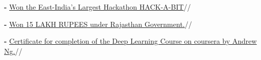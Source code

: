 \documentclass[espanol]{cv-style}     %
\begin{document}
\textbf{-}  {\href{https://www.facebook.com/pg/hackabit/posts/}{Won the East-India's Largest Hackathon HACK-A-BIT}}//

\textbf{-}
 {\href{https://www.inventiva.co.in/2018/07/27/meet-the-winners-of-hackathon-5-0-at-rajasthan-digifest-in-bikaner/}{ Won 15 LAKH RUPEES under Rajasthan Government.}}//

\textbf{-}
 {\href{https://www.coursera.org/account/accomplishments/certificate/E4KL4KCYWS2K}{Certificate for completion of the Deep Learning Course on coursera by Andrew Ng.}}//

\end{document}
